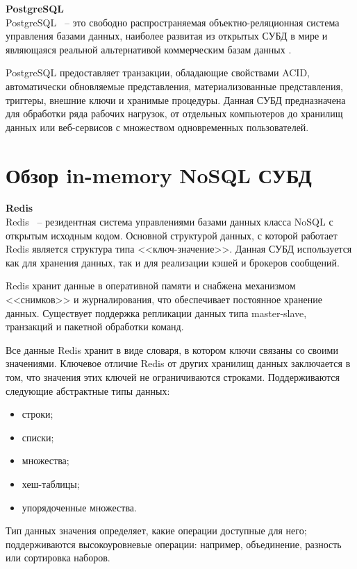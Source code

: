 \newpage

\noindent\textbf{PostgreSQL}\\

PostgreSQL~\cite{postgresql} -- это свободно распространяемая объектно-реляционная система управления базами данных, наиболее развитая из открытых СУБД в мире и являющаяся реальной альтернативой коммерческим базам данных \cite{postgresql-fact}.

PostgreSQL предоставляет транзакции, обладающие свойствами ACID, автоматически обновляемые представления, материализованные представления, триггеры, внешние ключи и хранимые процедуры. Данная СУБД предназначена для обработки ряда рабочих нагрузок, от отдельных компьютеров до хранилищ данных или веб-сервисов с множеством одновременных пользователей. 

\section{Обзор in-memory NoSQL СУБД}

\noindent\textbf{Redis}\\

Redis~\cite{redis} -- резидентная система управлениями базами данных класса NoSQL с открытым исходным кодом. Основной структурой данных, с которой работает Redis является структура типа <<ключ-значение>>. Данная СУБД используется как для хранения данных, так и для реализации кэшей и брокеров сообщений.

Redis хранит данные в оперативной памяти и снабжена механизмом <<снимков>> и журналирования, что обеспечивает постоянное хранение данных. Существует поддержка репликации данных типа master-slave, транзакций и пакетной обработки команд.

Все данные Redis хранит в виде словаря, в котором ключи связаны со своими значениями. Ключевое отличие Redis от других хранилищ данных заключается в том, что значения этих ключей не ограничиваются строками. Поддерживаются следующие абстрактные типы данных:

\begin{itemize}
	\item строки;
	\item списки;
	\item множества;
	\item хеш-таблицы;
	\item упорядоченные множества.
\end{itemize}

Тип данных значения определяет, какие операции доступные для него; поддерживаются высокоуровневые операции: например, объединение, разность или сортировка наборов.\\

